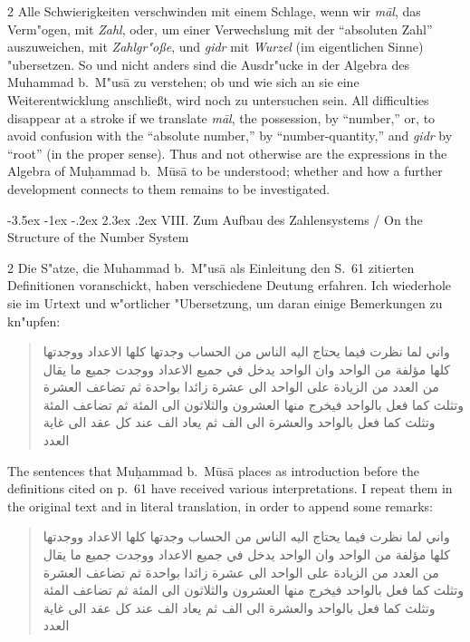 \documentclass[10pt,a4paper]{article}
\makeatletter
\renewcommand{\switchcolumn}{\syncronize\nointerlineskip\columnbreak}
\newcommand{\RL}[1]{\beginR#1\endR}
\newcommand{\ar}[1]{{\arabicfont\RL{#1}}}
\renewcommand{\section}{\@startsection{section}{1}{\z@}%
  {-3.5ex \@plus -1ex \@minus -.2ex}%
  {2.3ex \@plus .2ex}%
  {\normalfont\Large\bfseries\color{sectioncolor}}}
\newcommand{\enquote}[1]{``#1''}
\makeatother
\begin{document}
\begin{paracol}{2}
Alle Schwierigkeiten verschwinden mit einem Schlage, wenn wir \textit{m\=al}, das Verm"ogen, mit \textit{Zahl}, oder, um einer Verwechslung mit der \enquote{absoluten Zahl} auszuweichen, mit \textit{Zahlgr"o\ss{}e}, und \textit{gidr} mit \textit{Wurzel} (im eigentlichen Sinne) "ubersetzen. So und nicht anders sind die Ausdr"ucke in der Algebra des Muhammad b.\ M"us\=a zu verstehen; ob und wie sich an sie eine Weiterentwicklung anschlie\ss{}t, wird noch zu untersuchen sein.
\switchcolumn
All difficulties disappear at a stroke if we translate \textit{m\=al}, the possession, by ``number,'' or, to avoid confusion with the ``absolute number,'' by ``number-quantity,'' and \textit{gidr} by ``root'' (in the proper sense). Thus and not otherwise are the expressions in the Algebra of Mu\d{h}ammad b.\ M\=us\=a to be understood; whether and how a further development connects to them remains to be investigated.
\end{paracol}
\clearpage


\section{VIII. Zum Aufbau des Zahlensystems / On the Structure of the Number System}

\begin{paracol}{2}
Die S"atze, die Muhammad b.\ M"us\=a als Einleitung den S.\ 61 zitierten Definitionen voranschickt, haben verschiedene Deutung erfahren. Ich wiederhole sie im Urtext und w"ortlicher "Ubersetzung, um daran einige Bemerkungen zu kn"upfen:

\begin{quote}
\ar{واني لما نظرت فيما يحتاج اليه الناس من الحساب وجدتها كلها الاعداد ووجدتها كلها مؤلفة من الواحد وان الواحد يدخل في جميع الاعداد ووجدت جميع ما يقال من العدد من الزيادة على الواحد الى عشرة زائدا بواحدة ثم تضاعف العشرة وتثلث كما فعل بالواحد فيخرج منها العشرون والثلاثون الى المئة ثم تضاعف المئة وتثلث كما فعل بالواحد والعشرة الى الف ثم يعاد الف عند كل عقد الى غاية العدد}
\end{quote}
\switchcolumn
The sentences that Mu\d{h}ammad b.\ M\=us\=a places as introduction before the definitions cited on p.\ 61 have received various interpretations. I repeat them in the original text and in literal translation, in order to append some remarks:

\begin{quote}
\ar{واني لما نظرت فيما يحتاج اليه الناس من الحساب وجدتها كلها الاعداد ووجدتها كلها مؤلفة من الواحد وان الواحد يدخل في جميع الاعداد ووجدت جميع ما يقال من العدد من الزيادة على الواحد الى عشرة زائدا بواحدة ثم تضاعف العشرة وتثلث كما فعل بالواحد فيخرج منها العشرون والثلاثون الى المئة ثم تضاعف المئة وتثلث كما فعل بالواحد والعشرة الى الف ثم يعاد الف عند كل عقد الى غاية العدد}
\end{quote}
\end{paracol}
\end{document}
